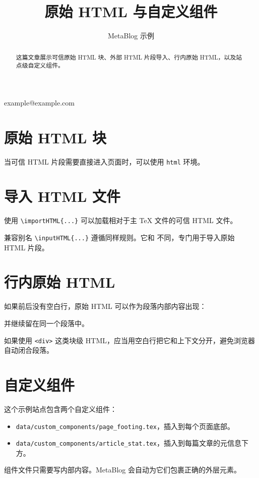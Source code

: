 

\title{原始 HTML 与自定义组件}
\author{MetaBlog 示例}{}{example@example.com}

\begin{abstract}
这篇文章展示可信原始 HTML 块、外部 HTML 片段导入、行内原始 HTML，以及站点级自定义组件。
\end{abstract}

\section{原始 HTML 块}

当可信 HTML 片段需要直接进入页面时，可以使用 \texttt{html} 环境。


\section{导入 HTML 文件}

使用 \verb|\importHTML{...}| 可以加载相对于主 TeX 文件的可信 HTML 文件。


兼容别名 \verb|\inputHTML{...}| 遵循同样规则。它和 \verb|| 不同，专门用于导入原始 HTML 片段。

\section{行内原始 HTML}

如果前后没有空白行，原始 HTML 可以作为段落内部内容出现：
并继续留在同一个段落中。

如果使用 \texttt{<div>} 这类块级 HTML，应当用空白行把它和上下文分开，避免浏览器自动闭合段落。

\section{自定义组件}

这个示例站点包含两个自定义组件：

\begin{itemize}
  \item \texttt{data/custom_components/page_footing.tex}，插入到每个页面底部。
  \item \texttt{data/custom_components/article_stat.tex}，插入到每篇文章的元信息下方。
\end{itemize}

组件文件只需要写内部内容。MetaBlog 会自动为它们包裹正确的外层元素。


